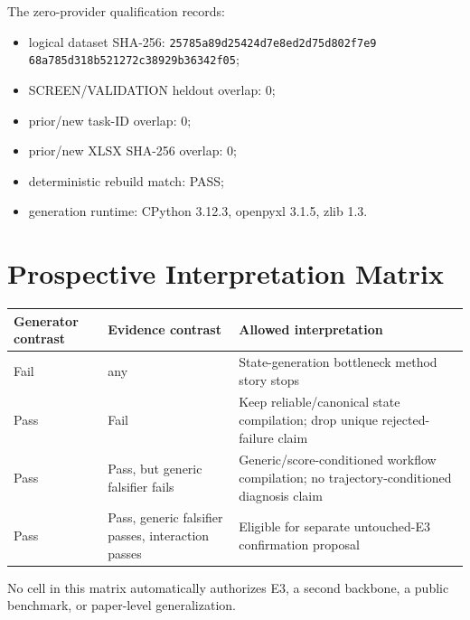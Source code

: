The zero-provider qualification records:
\begin{itemize}
    \item logical dataset SHA-256: \texttt{25785a89d25424d7e8ed2d75d802f7e9}\\
    \texttt{68a785d318b521272c38929b36342f05};
    \item SCREEN/VALIDATION heldout overlap: 0;
    \item prior/new task-ID overlap: 0;
    \item prior/new XLSX SHA-256 overlap: 0;
    \item deterministic rebuild match: PASS;
    \item generation runtime: CPython 3.12.3, openpyxl 3.1.5, zlib 1.3.
\end{itemize}

\section{Prospective Interpretation Matrix}

\begin{center}
\small
\begin{tabularx}{\linewidth}{>{\raggedright\arraybackslash}p{2.3cm}>{\raggedright\arraybackslash}p{2.3cm}>{\raggedright\arraybackslash}X}
\toprule
Generator contrast & Evidence contrast & Allowed interpretation \\
\midrule
Fail & any & State-generation bottleneck method story stops \\
Pass & Fail & Keep reliable/canonical state compilation; drop unique rejected-failure claim \\
Pass & Pass, but generic falsifier fails & Generic/score-conditioned workflow compilation; no trajectory-conditioned diagnosis claim \\
Pass & Pass, generic falsifier passes, interaction passes & Eligible for separate untouched-E3 confirmation proposal \\
\bottomrule
\end{tabularx}
\end{center}

No cell in this matrix automatically authorizes E3, a second backbone, a public benchmark, or paper-level generalization.
